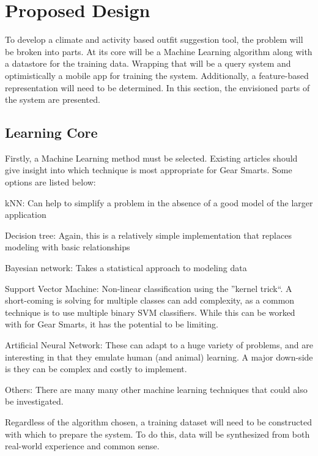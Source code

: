 \section{Proposed Design}
\label{section:propeseddesign}
To develop a climate and activity based outfit suggestion tool, the problem will be broken into parts.
At its core will be a Machine Learning algorithm along with a datastore for the training data. Wrapping that will
be a query system and optimistically a mobile app for training the system. Additionally, a feature-based representation
will need to be determined. In this section, the envisioned parts of the system are presented.

\subsection{Learning Core}
Firstly, a Machine Learning method must be selected. Existing articles should give insight into which technique is
most appropriate for Gear Smarts. Some options are listed below:

\begin{description}
  \item{kNN:} Can help to simplify a problem in the absence of a good model of the larger application
  \item{Decision tree:} Again, this is a relatively simple implementation that replaces modeling with basic relationships
  \item{Bayesian network:} Takes a statistical approach to modeling data
  \item{Support Vector Machine:} Non-linear classification using the ''kernel trick``. A short-coming is solving for multiple
  classes can add complexity, as a common technique is to use multiple binary SVM classifiers. While this can be worked with
  for Gear Smarts, it has the potential to be limiting.
  \item{Artificial Neural Network:} These can adapt to a huge variety of problems, and are interesting in that they emulate
  human (and animal) learning. A major down-side is they can be complex and costly to implement.
  \item{Others:} There are many many other machine learning techniques that could also be investigated.
\end{description}

Regardless of the algorithm chosen, a training dataset will need to be constructed with which to prepare the system. To do this,
data will be synthesized from both real-world experience and common sense.

